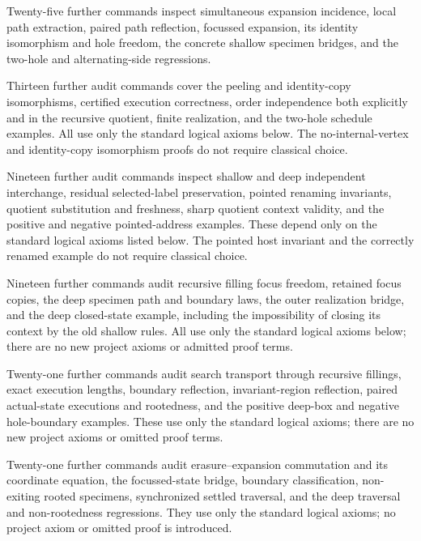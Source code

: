 Twenty-five further commands inspect simultaneous expansion incidence,
local path extraction, paired path reflection, focussed expansion, its identity
isomorphism and hole freedom, the concrete shallow specimen bridges, and the
two-hole and alternating-side regressions.

Thirteen further audit commands cover the peeling and identity-copy
isomorphisms, certified execution correctness, order independence both
explicitly and in the recursive quotient, finite realization, and the
two-hole schedule examples. All use only the standard logical axioms below.
The no-internal-vertex and identity-copy isomorphism proofs do not require
classical choice.

Nineteen further audit commands inspect shallow and deep independent
interchange, residual selected-label preservation, pointed renaming invariants,
quotient substitution and freshness, sharp quotient context validity, and
the positive and negative pointed-address examples. These depend only on
the standard logical axioms listed below. The pointed host invariant and
the correctly renamed example do not require classical choice.

Nineteen further commands audit recursive filling focus freedom, retained
focus copies, the deep specimen path and boundary laws, the outer realization
bridge, and the deep closed-state example, including the impossibility of
closing its context by the old shallow rules. All use only the standard logical
axioms below; there are no new project axioms or admitted proof terms.

Twenty-one further commands audit search transport through recursive fillings,
exact execution lengths, boundary reflection, invariant-region reflection,
paired actual-state executions and rootedness, and the positive deep-box and
negative hole-boundary examples. These use only the standard logical axioms;
there are no new project axioms or omitted proof terms.

Twenty-one further commands audit erasure--expansion commutation and its
coordinate equation, the focussed-state bridge, boundary classification,
non-exiting rooted specimens, synchronized settled traversal, and the deep
traversal and non-rootedness regressions. They use only the standard logical
axioms; no project axiom or omitted proof is introduced.

